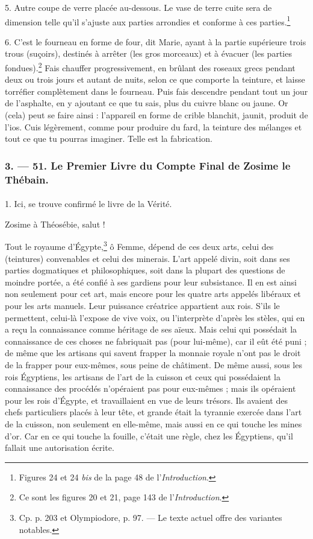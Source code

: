 \documentclass[landscape, a4paper, 11pt, oneside, polutonikogreek, french]{article}
\begin{document}
5. Autre coupe de verre placée au-dessous. Le vase de terre cuite sera de dimension telle qu'il s'ajuste aux parties arrondies et conforme à ces parties.\footnote{Figures 24 et 24 \emph{bis} de la page 48 de l'\emph{Introduction}.}

6. C'est le fourneau en forme de four, dit Marie, ayant à la partie supérieure trois trous (suçoirs), destinés à arrêter (les gros morceaux) et à évacuer (les parties fondues).\footnote{Ce sont les figures 20 et 21, page 143 de l'\emph{Introduction}.} Fais chauffer progressivement, en brûlant des roseaux grecs pendant deux ou trois jours et autant de nuits, selon ce que comporte la teinture, et laisse torréfier complètement dans le fourneau. Puis fais descendre pendant tout un jour de l'asphalte, en y ajoutant ce que tu sais, plus du cuivre blanc ou jaune. Or (cela) peut se faire ainsi : l'appareil en forme de crible blanchit, jaunit, produit de l'ios. Cuis légèrement, comme pour produire du fard, la teinture des mélanges et tout ce que tu pourras imaginer. Telle est la fabrication.

\bigskip
\centerline{\EightStarTaper}
\centerline{\EightStarTaper\EightStarTaper}
\bigskip

\subsubsection{3. --- 51. Le Premier Livre du Compte Final de Zosime le Thébain.}
\paragraph{}
1. Ici, se trouve confirmé le livre de la Vérité.

Zosime à Théosébie, salut !

Tout le royaume d'Égypte,\footnote{Cp. p. 203 et Olympiodore, p. 97. --- Le texte actuel offre des variantes notables.} ô Femme, dépend de ces deux arts, celui des (teintures) convenables et celui des minerais. L'art appelé divin, soit dans ses parties dogmatiques et philosophiques, soit dans la plupart des questions de moindre portée, a été confié à ses gardiens pour leur subsistance. Il en est ainsi non seulement pour cet art, mais encore pour les quatre arts appelés libéraux et pour les arts manuels. Leur puissance créatrice appartient aux rois. S'ils le permettent, celui-là l'expose de vive voix, ou l'interprète d'après les stèles, qui en a reçu la connaissance comme héritage de ses aïeux. Mais celui qui possédait la connaissance de ces choses ne fabriquait pas (pour lui-même), car il eût été puni ; de même que les artisans qui savent frapper la monnaie royale n'ont pas le droit de la frapper pour eux-mêmes, sous peine de châtiment. De même aussi, sous les rois Égyptiens, les artisans de l'art de la cuisson et ceux qui possédaient la connaissance des procédés n'opéraient pas pour eux-mêmes ; mais ils opéraient pour les rois d'Égypte, et travaillaient en vue de leurs trésors. Ils avaient des chefs particuliers placés à leur tête, et grande était la tyrannie exercée dans l'art de la cuisson, non seulement en elle-même, mais aussi en ce qui touche les mines d'or. Car en ce qui touche la fouille, c'était une règle, chez les Égyptiens, qu'il fallait une autorisation écrite.
\end{document}

